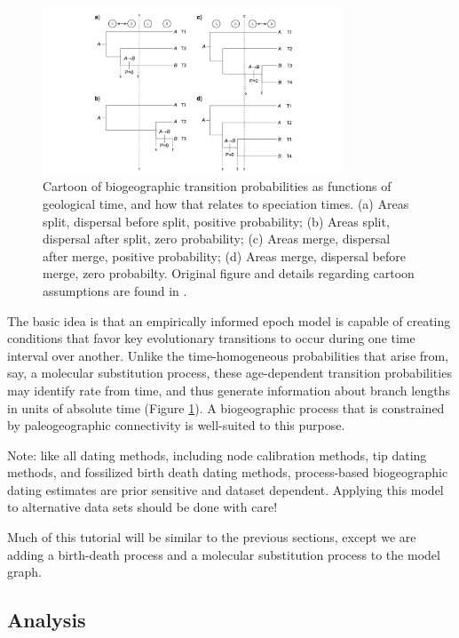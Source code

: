 \begin{figure}[!h]
\centering
\includegraphics[width=0.8\textwidth]{figures/fig_biogeo_dating.png}
\caption{Cartoon of biogeographic transition probabilities as functions of geological time, and how that relates to speciation times. (a) Areas split, dispersal before split, positive probability; (b) Areas split, dispersal after split, zero probability; (c) Areas merge, dispersal after merge, positive probability; (d) Areas merge, dispersal before merge, zero probabilty. Original figure and details regarding cartoon assumptions are found in \citet{Landis2016}.}
\label{fig:biogeo_dating_cartoon}
\end{figure}

The basic idea is that an empirically informed epoch model is capable of creating conditions that favor key evolutionary transitions to occur during one time interval over another.
Unlike the time-homogeneous probabilities that arise from, say, a molecular substitution process, these age-dependent transition probabilities may identify rate from time, and thus generate information about branch lengths in units of absolute time (Figure \ref{fig:biogeo_dating_cartoon}).
A biogeographic process that is constrained by paleogeographic connectivity is well-suited to this purpose.

Note: like all dating methods, including node calibration methods, tip dating methods, and fossilized birth death dating methods, process-based biogeographic dating estimates are prior sensitive and dataset dependent.
Applying this model to alternative data sets should be done with care!

Much of this tutorial will be similar to the previous sections, except we are adding a birth-death process and a molecular substitution process to the model graph.

\subsection{Analysis}

